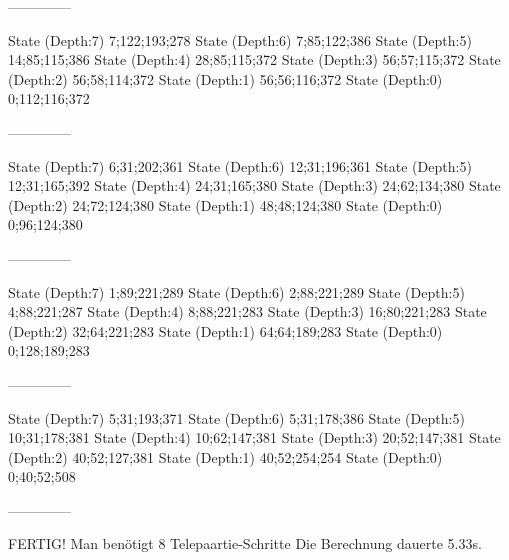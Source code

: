 \documentclass[a4paper,10pt,ngerman]{scrartcl}
\begin{document}







\begin{lstcs}
--------------

State (Depth:7) {7;122;193;278}
State (Depth:6) {7;85;122;386}
State (Depth:5) {14;85;115;386}
State (Depth:4) {28;85;115;372}
State (Depth:3) {56;57;115;372}
State (Depth:2) {56;58;114;372}
State (Depth:1) {56;56;116;372}
State (Depth:0) {0;112;116;372}

--------------

State (Depth:7) {6;31;202;361}
State (Depth:6) {12;31;196;361}
State (Depth:5) {12;31;165;392}
State (Depth:4) {24;31;165;380}
State (Depth:3) {24;62;134;380}
State (Depth:2) {24;72;124;380}
State (Depth:1) {48;48;124;380}
State (Depth:0) {0;96;124;380}

--------------

State (Depth:7) {1;89;221;289}
State (Depth:6) {2;88;221;289}
State (Depth:5) {4;88;221;287}
State (Depth:4) {8;88;221;283}
State (Depth:3) {16;80;221;283}
State (Depth:2) {32;64;221;283}
State (Depth:1) {64;64;189;283}
State (Depth:0) {0;128;189;283}

--------------

State (Depth:7) {5;31;193;371}
State (Depth:6) {5;31;178;386}
State (Depth:5) {10;31;178;381}
State (Depth:4) {10;62;147;381}
State (Depth:3) {20;52;147;381}
State (Depth:2) {40;52;127;381}
State (Depth:1) {40;52;254;254}
State (Depth:0) {0;40;52;508}

--------------


FERTIG!
Man benötigt 8 Telepaartie-Schritte
Die Berechnung dauerte 5.33s.
\end{lstcs}
\end{document}
